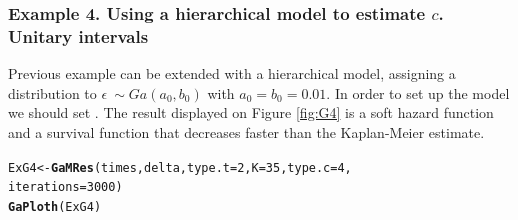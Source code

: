 \documentclass[letterpaper]{article}\usepackage[]{graphicx}\usepackage[]{color}
\makeatletter
\newcommand{\hlnum}[1]{\textcolor[rgb]{0.686,0.059,0.569}{#1}}%
\newcommand{\hlstd}[1]{\textcolor[rgb]{0.345,0.345,0.345}{#1}}%
\newcommand{\hlkwb}[1]{\textcolor[rgb]{0.69,0.353,0.396}{#1}}%
\newcommand{\hlkwc}[1]{\textcolor[rgb]{0.333,0.667,0.333}{#1}}%
\newcommand{\hlkwd}[1]{\textcolor[rgb]{0.737,0.353,0.396}{\textbf{#1}}}%
\newenvironment{kframe}{%
 \def\at@end@of@kframe{}%
 \ifinner\ifhmode%
  \def\at@end@of@kframe{\end{minipage}}%
  \begin{minipage}{\columnwidth}%
 \fi\fi%
 \def\FrameCommand##1{\hskip\@totalleftmargin \hskip-\fboxsep
 \colorbox{shadecolor}{##1}\hskip-\fboxsep
     \hskip-\linewidth \hskip-\@totalleftmargin \hskip\columnwidth}%
 \MakeFramed {\advance\hsize-\width
   \@totalleftmargin\z@ \linewidth\hsize
   \@setminipage}}%
 {\par\unskip\endMakeFramed%
 \at@end@of@kframe}
\newenvironment{knitrout}{}{} %
\makeatother
\begin{document}
\subsubsection{Example 4. Using a hierarchical model to estimate $c$. Unitary intervals}

Previous example can be extended with a hierarchical model, assigning a distribution to $\epsilon ~ \sim Ga(a_0,b_0)$ with $a_0=b_0=0.01$. In order to set up the model we should set . The result displayed on Figure \ref{fig:G4} is a soft hazard function and a survival function that decreases faster than the Kaplan-Meier estimate.

\begin{knitrout}
\color{fgcolor}\begin{kframe}
\begin{alltt}
\hlstd{ExG4} \hlkwb{<-} \hlkwd{GaMRes}\hlstd{(times, delta,} \hlkwc{type.t} \hlstd{=} \hlnum{2}\hlstd{,} \hlkwc{K} \hlstd{=} \hlnum{35}\hlstd{,} \hlkwc{type.c} \hlstd{=} \hlnum{4}\hlstd{,}
               \hlkwc{iterations} \hlstd{=} \hlnum{3000}\hlstd{)}
\hlkwd{GaPloth}\hlstd{(ExG4)}
\end{alltt}
\end{kframe}
\end{knitrout}
\end{document}
